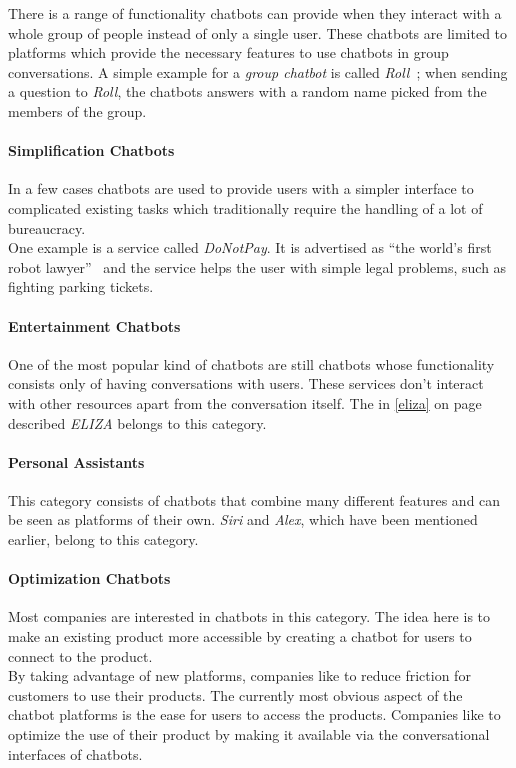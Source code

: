 There is a range of functionality chatbots can provide when they interact with a whole group of people instead of only a single user.
These chatbots are limited to platforms which provide the necessary features to use chatbots in group conversations.
A simple example for a \emph{group chatbot} is called \emph{Roll}~\cite{venturebeat};
when sending a question to \emph{Roll}, the chatbots answers with a random name picked from the members of the group.


\paragraph{Simplification Chatbots}

In a few cases chatbots are used to provide users with a simpler interface to complicated existing tasks which traditionally require the handling of a lot of bureaucracy.
\\
One example is a service called \emph{DoNotPay}.
It is advertised as ``the world's first robot lawyer''~\cite{oreilly} and the service helps the user with simple legal problems,
such as fighting parking tickets.


\paragraph{Entertainment Chatbots}

One of the most popular kind of chatbots are still chatbots whose functionality consists only of having conversations with users.
These services don't interact with other resources apart from the conversation itself.
The in \ref{eliza} on page \pageref{eliza} described \emph{ELIZA} belongs to this category.


\paragraph{Personal Assistants}
\label{assistants}

This category consists of chatbots that combine many different features and can be seen as platforms of their own.
\emph{Siri} and \emph{Alex}, which have been mentioned earlier, belong to this category.


\paragraph{Optimization Chatbots}

Most companies are interested in chatbots in this category.
The idea here is to make an existing product more accessible by creating a chatbot for users to connect to the product.
\\
By taking advantage of new platforms, companies like to reduce friction for customers to use their products.
The currently most obvious aspect of the chatbot platforms is the ease for users to access the products.
Companies like to optimize the use of their product by making it available via the conversational interfaces of chatbots.
\\

